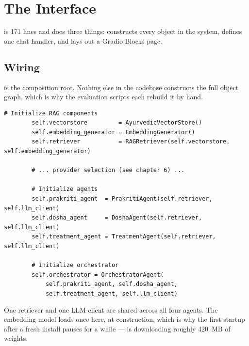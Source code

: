 \chapter{The Interface}

 is 171 lines and does three things: constructs every object in the system, defines one chat handler, and lays out a Gradio Blocks page.

\section{Wiring}

 is the composition root. Nothing else in the codebase constructs the full object graph, which is why the evaluation scripts each rebuild it by hand.

\begin{lstlisting}[style=py,firstnumber=43]
        # Initialize RAG components
        self.vectorstore         = AyurvedicVectorStore()
        self.embedding_generator = EmbeddingGenerator()
        self.retriever           = RAGRetriever(self.vectorstore, self.embedding_generator)

        # ... provider selection (see chapter 6) ...

        # Initialize agents
        self.prakriti_agent  = PrakritiAgent(self.retriever, self.llm_client)
        self.dosha_agent     = DoshaAgent(self.retriever, self.llm_client)
        self.treatment_agent = TreatmentAgent(self.retriever, self.llm_client)

        # Initialize orchestrator
        self.orchestrator = OrchestratorAgent(
            self.prakriti_agent, self.dosha_agent,
            self.treatment_agent, self.llm_client)
\end{lstlisting}

One retriever and one LLM client are shared across all four agents. The embedding model loads once here, at construction, which is why the first startup after a fresh install pauses for a while ---  is downloading roughly 420~MB of weights.

